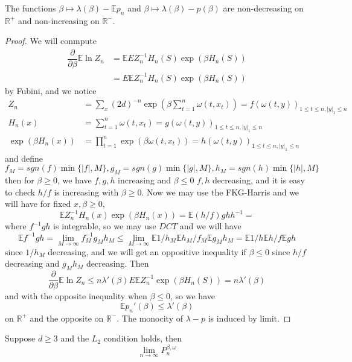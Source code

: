 \begin{theorem}
    The functions $\beta \mapsto \lambda(\beta) - \mathbb{E}p_n$ and $\beta \mapsto \lambda(\beta) - p(\beta)$ are non-decreasing on $\mathbb{R}^+$ and non-increasing on $\mathbb{R}^-$.
\end{theorem}
\begin{proof}
    We will conmpute
    \[
    \begin{aligned}
        \dfrac{\partial}{\partial \beta} \mathbb{E} \ln Z_n &= \mathbb{E} EZ_n^{-1}H_n(S)\exp(\beta H_n(S))\\
        &= E \mathbb{E} Z_n^{-1}H_n(S)\exp{(\beta H_n(S))} 
    \end{aligned}
    \]
    by Fubini, and we notice
    \[
    \begin{aligned}
    Z_n &= \sum\limits_{x} (2d)^{-n} \exp(\beta \sum\limits_{t=1}^n \omega(t,x_t)) = f(\omega(t,y))_{1\leq t\leq n, |y|_1 \leq n}\\
    H_n(x) &= \sum\limits_{t=1}^n \omega(t,x_t) = g(\omega(t,y))_{1\leq t\leq n, |y|_1 \leq n}\\
    \exp(\beta H_n(x)) &= \prod_{t=1}^n \exp{(\beta \omega(t,x_t))} = h(\omega(t,y))_{1\leq t\leq n, |y|_1 \leq n}
    \end{aligned}
    \]
    and define
    \[
    f_M = sgn(f)\min\{|f|,M\}, g_M = sgn(g)\min\{|g|,M\}, h_M = sgn(h)\min\{|h|,M\}
    \]
    then for $\beta \geq 0$, we have $f,g,h$ increasing and $\beta \leq 0$ $f,h$ decreasing, and it is easy to check $h/f$ is increasing with $\beta \geq 0$. Now we may use the FKG-Harris and we will have for fixed $x, \beta \geq 0$,
    \[
    \mathbb{E}Z_n^{-1} H_n(x)\exp{(\beta H_n(x))} = \mathbb{E} (h/f)gh h^{-1} =
    \]
    where $f^{-1}gh$ is integrable, so we may use $DCT$ and we will have
    \[
    \mathbb{E} f^{-1}gh = \lim_{M\to\infty} f_M^{-1} g_M h_M \leq \lim_{M\to\infty} \mathbb{E} 1/h_M \mathbb{E} h_M/f_M \mathbb{E} g_Mh_M = \mathbb{E} 1/h \mathbb{E} h/f \mathbb{E} gh 
    \]
    since $1/h_M$ decreasing, and we will get an oppositive inequality if $\beta \leq 0$ since $h/f$ decreasing and $g_Mh_M$ decreasing. Then
    \[
    \dfrac{\partial}{\partial \beta} \mathbb{E} \ln Z_n \leq n\lambda'(\beta) E\mathbb{E}Z_n^{-1}\exp{(\beta H_n(S))} = n\lambda'(\beta)
    \]
    and with the opposite inequality when $\beta \leq 0$, so we have
    \[
    \mathbb{E}p_n'(\beta) \leq \lambda'(\beta)
    \]
    on $\mathbb{R}^+$ and the opposite on $\mathbb{R}^{-}$. The monocity of $\lambda-p$ is induced by limit.
\end{proof}

\begin{theorem}
    Suppose $d \geq 3$ and the $L_2$ condition holds, then
    \[
    \lim\limits_{n\to\infty} P_{n}^{\beta,\omega} 
    \]
\end{theorem}